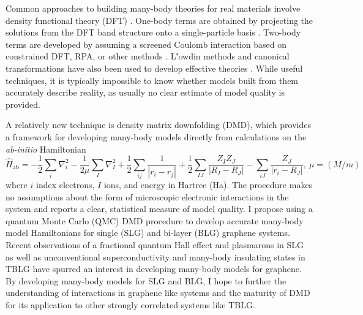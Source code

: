 \documentclass[12pt]{article}
\begin{document}
Common approaches to building many-body theories for real materials involve density functional theory (DFT) \cite{PhysRev.140.A1133}.
One-body terms are obtained by projecting the solutions from the DFT band structure onto a single-particle basis \cite{PhysRevLett.87.047003}.
Two-body terms are developed by assuming a screened Coulomb interaction based on constrained DFT, RPA, or other methods \cite{PhysRevB.62.R16219, PhysRevB.70.195104, PhysRevB.88.075106}.
L\''{o}wdin methods and canonical transformations have also been used to develop effective theories \cite{doi:10.1063/1.4802766, PhysRevA.81.013402, doi:10.1063/1.2196410}.
While useful techniques, it is typically impossible to know whether models built from them accurately describe reality, as usually no clear estimate of model quality is provided.

A relatively new technique is density matrix downfolding (DMD), which provides a framework for developing many-body models directly from calculations on the \textit{ab-initio} Hamiltonian
\begin{equation}
\hat{H}_\text{ab} = -\frac{1}{2} \sum_{i} \nabla_i^2 -\frac{1}{2\mu}\sum_{I} \nabla_I^2 + \frac{1}{2}\sum_{ij} \frac{1}{|r_i - r_j|} + \frac{1}{2}\sum_{IJ} \frac{Z_I Z_J}{|R_I - R_J|} - \sum_{iJ}\frac{Z_J}{|r_i - R_J|},\ \mu = (M/m)
\label{Hab}
\end{equation}
where $i$ index electrons, $I$ ions, and energy in Hartree (Ha).
The procedure makes no assumptions about the form of microscopic electronic interactions in the system and reports a clear, statistical measure of model quality.
I propose using a quantum Monte Carlo (QMC) DMD procedure to develop accurate many-body model Hamiltonians for single (SLG) and bi-layer (BLG) graphene systems.
Recent observations of a fractional quantum Hall effect \cite {Bolotin2009, Du2009} and plasmarons \cite{Bostwick999} in SLG as well as unconventional superconductivity \cite{Cao2018_2} and many-body insulating states \cite{Cao2018} in TBLG have spurred an interest in developing many-body models for graphene.
By developing many-body models for SLG and BLG, I hope to further the understanding of interactions in graphene like systems and the maturity of DMD for its application to other strongly correlated systems like TBLG.
\end{document}
